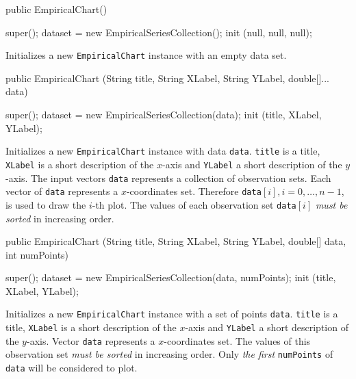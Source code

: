 \begin{code}
   public EmpiricalChart() \begin{hide} {
      super();
      dataset = new EmpiricalSeriesCollection();
      init (null, null, null);
   }\end{hide}
\end{code}
\begin{tabb}
   Initializes a new \texttt{EmpiricalChart} instance with an empty data set.
\end{tabb}
\begin{code}

   public EmpiricalChart (String title, String XLabel, String YLabel,
                          double[]... data) \begin{hide} {
      super();
      dataset = new EmpiricalSeriesCollection(data);
      init (title, XLabel, YLabel);
   }\end{hide}
\end{code}
\begin{tabb}
   Initializes a new \texttt{EmpiricalChart} instance with data \texttt{data}.
   \texttt{title} is a title, \texttt{XLabel} is a short description of
   the $x$-axis and \texttt{YLabel} a short description of the $y$-axis.
   The input vectors \texttt{data} represents a collection of observation sets.
   Each vector of \texttt{data} represents a $x$-coordinates set.
   Therefore \texttt{data}$[i], i = 0,\ldots,n-1$, is used to draw the $i$-th plot.
   The values of each observation set \texttt{data}$[i]$ \emph{must be sorted}
   in increasing order.
\end{tabb}
\begin{htmlonly}
\end{htmlonly}
\begin{code}

   public EmpiricalChart (String title, String XLabel, String YLabel,
                          double[] data, int numPoints) \begin{hide} {
      super();
      dataset = new EmpiricalSeriesCollection(data, numPoints);
      init (title, XLabel, YLabel);
   }\end{hide}
\end{code}
\begin{tabb}
   Initializes a new \texttt{EmpiricalChart} instance with a set of points
   \texttt{data}. \texttt{title} is a title, \texttt{XLabel} is a short
   description of the $x$-axis and \texttt{YLabel} a short description of the
   $y$-axis. Vector \texttt{data} represents a $x$-coordinates set. The values
   of this observation set \emph{must be sorted} in increasing order. Only
   \emph{the first} \texttt{numPoints} of \texttt{data} will
   be considered to plot.
\end{tabb}

